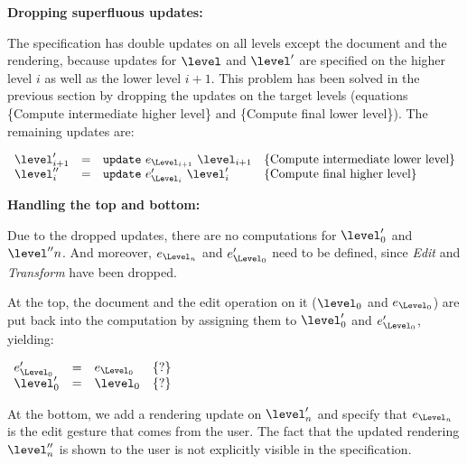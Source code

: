 
\bigskip
{\bf Dropping superfluous updates:}

The specification has double updates on all levels except the document and the rendering, because updates for $\level$ and $\level'$ are specified on the higher level $i$ as well as the lower level $i+1$. This problem has been solved in the previous section by dropping the updates on the target levels (equations \{Compute intermediate higher level\} and \{Compute final lower level\}). The remaining updates are:

\begin{small}\( \begin{array}{lcll} 
\level'_{i+1} 	& = & {\tt update}~e_{\Level_{i+1}}~\level_{i+1}                 & \text{\{Compute intermediate lower level\}}\\
\level''_{i} & = & {\tt update}~e'_{\Level_{i}}~\level'_{i}                 & \text{\{Compute final higher level\}}\\
\end{array}\)
\end{small}

\bigskip
{\bf Handling the top and bottom:}

Due to the dropped updates, there are no computations for $\level'_0$ and $\level''{n}$. And moreover, $e_{\Level_n}$ and $e'_{\Level_0}$ need to be defined, since {\em Edit} and {\em Transform} have been dropped. 

At the top, the document and the edit operation on it ($\level_0$ and $e_{\Level_0}$) are put back into the computation by assigning them to $\level'_0$ and $e'_{\Level_0}$, yielding:

\begin{small}\( \begin{array}{lcll} 
e'_{\Level_{0}}  & = & e_{\Level_{0}}		& \text{\{?\}}\\
\level'_{0} & = & \level_{0}				& \text{\{?\}}\\
\end{array}\)
\end{small}

At the bottom, we add a rendering update on $\level'_n$ and specify that $e_{\Level_n}$ is the edit gesture that comes from the user. The fact that the updated rendering $\level''_n$ is shown to the user is not explicitly visible in the specification.

